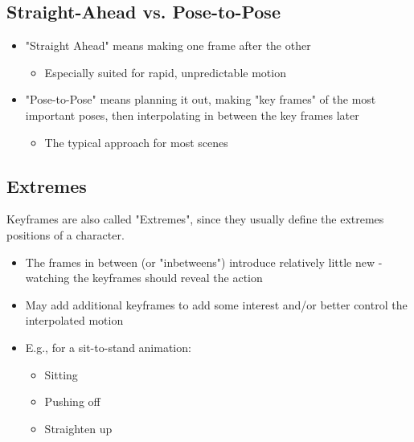\documentclass{article}
\begin{document}
\subsection*{Straight-Ahead vs. Pose-to-Pose}
\begin{itemize}
    \item "Straight Ahead" means making one frame after the other
    \begin{itemize}
        \item Especially suited for rapid, unpredictable motion
    \end{itemize}
    \item "Pose-to-Pose" means planning it out, making "key frames" of the most important poses, then interpolating in between the key frames later
    \begin{itemize}
        \item The typical approach for most scenes
    \end{itemize}
\end{itemize}

\subsection*{Extremes}
Keyframes are also called "Extremes", since they usually define the extremes positions of a character.
\begin{itemize}
    \item The frames in between (or "inbetweens") introduce relatively little new - watching the keyframes should reveal the action
    \item May add additional keyframes to add some interest and/or better control the interpolated motion
    \item E.g., for a sit-to-stand animation:
    \begin{itemize}
        \item Sitting
        \item Pushing off
        \item Straighten up
    \end{itemize}
\end{itemize}
 
\end{document}
